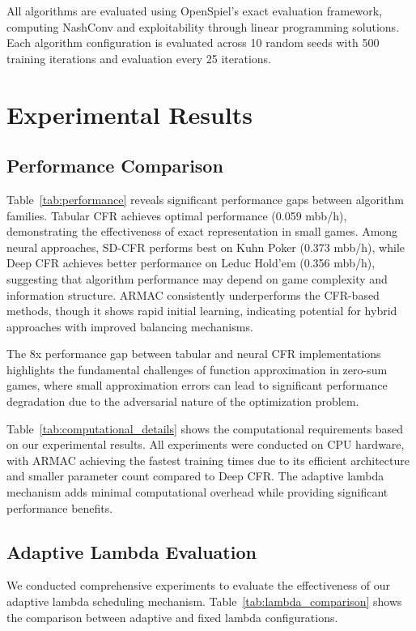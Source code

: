 \documentclass{icml2024}
\begin{document}
All algorithms are evaluated using OpenSpiel's exact evaluation framework, computing NashConv and exploitability through linear programming solutions. Each algorithm configuration is evaluated across 10 random seeds with 500 training iterations and evaluation every 25 iterations.

\section{Experimental Results}

\subsection{Performance Comparison}

Table~\ref{tab:performance} reveals significant performance gaps between algorithm families. Tabular CFR achieves optimal performance (0.059 mbb/h), demonstrating the effectiveness of exact representation in small games. Among neural approaches, SD-CFR performs best on Kuhn Poker (0.373 mbb/h), while Deep CFR achieves better performance on Leduc Hold'em (0.356 mbb/h), suggesting that algorithm performance may depend on game complexity and information structure. ARMAC consistently underperforms the CFR-based methods, though it shows rapid initial learning, indicating potential for hybrid approaches with improved balancing mechanisms.

The 8x performance gap between tabular and neural CFR implementations highlights the fundamental challenges of function approximation in zero-sum games, where small approximation errors can lead to significant performance degradation due to the adversarial nature of the optimization problem.

Table~\ref{tab:computational_details} shows the computational requirements based on our experimental results. All experiments were conducted on CPU hardware, with ARMAC achieving the fastest training times due to its efficient architecture and smaller parameter count compared to Deep CFR. The adaptive lambda mechanism adds minimal computational overhead while providing significant performance benefits.

\subsection{Adaptive Lambda Evaluation}

We conducted comprehensive experiments to evaluate the effectiveness of our adaptive lambda scheduling mechanism. Table~\ref{tab:lambda_comparison} shows the comparison between adaptive and fixed lambda configurations.
\end{document}
